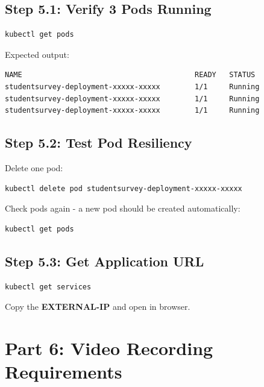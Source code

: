 \documentclass[12pt,a4paper]{article}
\begin{document}
\subsection{Step 5.1: Verify 3 Pods Running}

\begin{lstlisting}[language=bash]
kubectl get pods
\end{lstlisting}

Expected output:
\begin{lstlisting}
NAME                                        READY   STATUS    
studentsurvey-deployment-xxxxx-xxxxx        1/1     Running   
studentsurvey-deployment-xxxxx-xxxxx        1/1     Running   
studentsurvey-deployment-xxxxx-xxxxx        1/1     Running   
\end{lstlisting}

\subsection{Step 5.2: Test Pod Resiliency}

Delete one pod:

\begin{lstlisting}[language=bash]
kubectl delete pod studentsurvey-deployment-xxxxx-xxxxx
\end{lstlisting}

Check pods again - a new pod should be created automatically:

\begin{lstlisting}[language=bash]
kubectl get pods
\end{lstlisting}

\subsection{Step 5.3: Get Application URL}

\begin{lstlisting}[language=bash]
kubectl get services
\end{lstlisting}

Copy the \textbf{EXTERNAL-IP} and open in browser.

\newpage

\section{Part 6: Video Recording Requirements}
\end{document}
